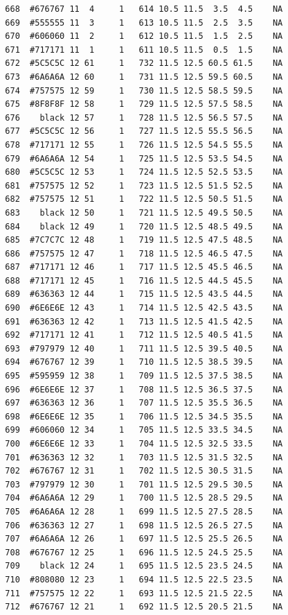 \documentclass[12pt,twoside]{reedthesis}
\begin{document}
\begin{verbatim}
  668  #676767 11  4     1   614 10.5 11.5  3.5  4.5    NA
  669  #555555 11  3     1   613 10.5 11.5  2.5  3.5    NA
  670  #606060 11  2     1   612 10.5 11.5  1.5  2.5    NA
  671  #717171 11  1     1   611 10.5 11.5  0.5  1.5    NA
  672  #5C5C5C 12 61     1   732 11.5 12.5 60.5 61.5    NA
  673  #6A6A6A 12 60     1   731 11.5 12.5 59.5 60.5    NA
  674  #757575 12 59     1   730 11.5 12.5 58.5 59.5    NA
  675  #8F8F8F 12 58     1   729 11.5 12.5 57.5 58.5    NA
  676    black 12 57     1   728 11.5 12.5 56.5 57.5    NA
  677  #5C5C5C 12 56     1   727 11.5 12.5 55.5 56.5    NA
  678  #717171 12 55     1   726 11.5 12.5 54.5 55.5    NA
  679  #6A6A6A 12 54     1   725 11.5 12.5 53.5 54.5    NA
  680  #5C5C5C 12 53     1   724 11.5 12.5 52.5 53.5    NA
  681  #757575 12 52     1   723 11.5 12.5 51.5 52.5    NA
  682  #757575 12 51     1   722 11.5 12.5 50.5 51.5    NA
  683    black 12 50     1   721 11.5 12.5 49.5 50.5    NA
  684    black 12 49     1   720 11.5 12.5 48.5 49.5    NA
  685  #7C7C7C 12 48     1   719 11.5 12.5 47.5 48.5    NA
  686  #757575 12 47     1   718 11.5 12.5 46.5 47.5    NA
  687  #717171 12 46     1   717 11.5 12.5 45.5 46.5    NA
  688  #717171 12 45     1   716 11.5 12.5 44.5 45.5    NA
  689  #636363 12 44     1   715 11.5 12.5 43.5 44.5    NA
  690  #6E6E6E 12 43     1   714 11.5 12.5 42.5 43.5    NA
  691  #636363 12 42     1   713 11.5 12.5 41.5 42.5    NA
  692  #717171 12 41     1   712 11.5 12.5 40.5 41.5    NA
  693  #797979 12 40     1   711 11.5 12.5 39.5 40.5    NA
  694  #676767 12 39     1   710 11.5 12.5 38.5 39.5    NA
  695  #595959 12 38     1   709 11.5 12.5 37.5 38.5    NA
  696  #6E6E6E 12 37     1   708 11.5 12.5 36.5 37.5    NA
  697  #636363 12 36     1   707 11.5 12.5 35.5 36.5    NA
  698  #6E6E6E 12 35     1   706 11.5 12.5 34.5 35.5    NA
  699  #606060 12 34     1   705 11.5 12.5 33.5 34.5    NA
  700  #6E6E6E 12 33     1   704 11.5 12.5 32.5 33.5    NA
  701  #636363 12 32     1   703 11.5 12.5 31.5 32.5    NA
  702  #676767 12 31     1   702 11.5 12.5 30.5 31.5    NA
  703  #797979 12 30     1   701 11.5 12.5 29.5 30.5    NA
  704  #6A6A6A 12 29     1   700 11.5 12.5 28.5 29.5    NA
  705  #6A6A6A 12 28     1   699 11.5 12.5 27.5 28.5    NA
  706  #636363 12 27     1   698 11.5 12.5 26.5 27.5    NA
  707  #6A6A6A 12 26     1   697 11.5 12.5 25.5 26.5    NA
  708  #676767 12 25     1   696 11.5 12.5 24.5 25.5    NA
  709    black 12 24     1   695 11.5 12.5 23.5 24.5    NA
  710  #808080 12 23     1   694 11.5 12.5 22.5 23.5    NA
  711  #757575 12 22     1   693 11.5 12.5 21.5 22.5    NA
  712  #676767 12 21     1   692 11.5 12.5 20.5 21.5    NA

\end{verbatim}
\end{document}
